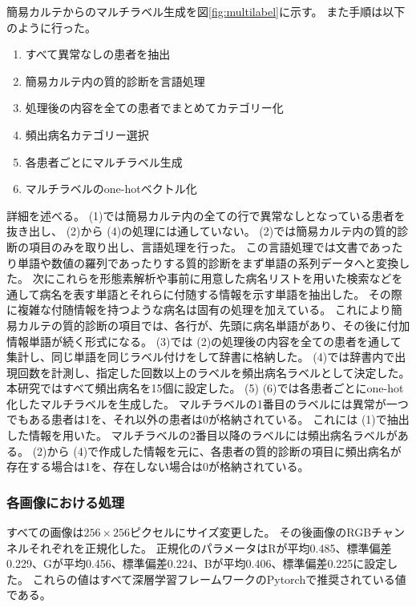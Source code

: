 簡易カルテからのマルチラベル生成を図\ref{fig:multilabel}に示す。
また手順は以下のように行った。

\begin{enumerate}
    \item すべて異常なしの患者を抽出
    \item 簡易カルテ内の質的診断を言語処理
    \item 処理後の内容を全ての患者でまとめてカテゴリー化
    \item 頻出病名カテゴリー選択
    \item 各患者ごとにマルチラベル生成
    \item マルチラベルのone-hotベクトル化
\end{enumerate}

詳細を述べる。
 (1)では簡易カルテ内の全ての行で異常なしとなっている患者を抜き出し、 (2)から (4)の処理には通していない。
 (2)では簡易カルテ内の質的診断の項目のみを取り出し、言語処理を行った。
この言語処理では文書であったり単語や数値の羅列であったりする質的診断をまず単語の系列データへと変換した。
次にこれらを形態素解析\cite{MeCab}や事前に用意した病名リストを用いた検索などを通して病名を表す単語とそれらに付随する情報を示す単語を抽出した。
その際に複雑な付随情報を持つような病名は固有の処理を加えている。
これにより簡易カルテの質的診断の項目では、各行が、先頭に病名単語があり、その後に付加情報単語が続く形式になる。
(3)では (2)の処理後の内容を全ての患者を通して集計し、同じ単語を同じラベル付けをして辞書に格納した。 
(4)では辞書内で出現回数を計測し、指定した回数以上のラベルを頻出病名ラベルとして決定した。
本研究ではすべて頻出病名を15個に設定した。
 (5) (6)では各患者ごとにone-hot化したマルチラベルを生成した。
マルチラベルの1番目のラベルには異常が一つでもある患者は1を、それ以外の患者は0が格納されている。
これには (1)で抽出した情報を用いた。
マルチラベルの2番目以降のラベルには頻出病名ラベルがある。 
(2)から (4)で作成した情報を元に、各患者の質的診断の項目に頻出病名が存在する場合は1を、存在しない場合は0が格納されている。
\subsubsection{各画像における処理}
すべての画像は$256 \times 256$ピクセルにサイズ変更した。
その後画像のRGBチャンネルそれぞれを正規化した。
正規化のパラメータはRが平均0.485、標準偏差0.229、Gが平均0.456、標準偏差0.224、Bが平均0.406、標準偏差0.225に設定した。
これらの値はすべて深層学習フレームワークのPytorch\cite{Pytorch}で推奨されている値である。
